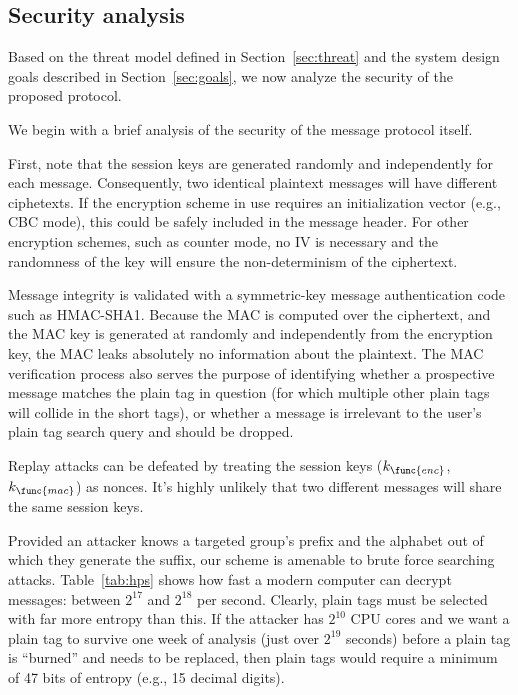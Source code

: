 \subsection{Security analysis}
\label{sec:security}

Based on the threat model defined in Section~\ref{sec:threat} and the
system design goals described in Section~\ref{sec:goals}, we now analyze
the security of the proposed \hoot protocol.

%
We begin with a brief analysis of the security of the message protocol
itself.

First, note that the session keys are generated randomly and
independently for each message. Consequently, two identical plaintext messages
will have different ciphetexts. If the encryption scheme in use requires
an initialization vector (e.g., CBC mode), this could be safely included in the
message header. For other encryption schemes, such as counter mode, no
IV is necessary and the randomness of the key will ensure the
non-determinism of the ciphertext.

Message integrity is validated with a symmetric-key message
authentication code such as HMAC-SHA1. Because the MAC is computed over the
ciphertext, and the MAC key is generated at randomly and independently
from the encryption key, the MAC leaks
absolutely no information about the plaintext. The MAC verification
process also serves the purpose of identifying whether a prospective
message matches the plain tag in question (for which multiple other
plain tags will collide in the short tags), or whether a message is
irrelevant to the user's plain tag search query and should be dropped.

Replay attacks can be defeated by treating the session keys
($k_{\func{enc}}$, $k_{\func{mac}}$) as nonces. It's highly unlikely
that two different messages will share the same session keys.


%
Provided an attacker knows a targeted group's prefix and the alphabet
out of which they generate the suffix, our scheme is amenable to brute
force searching attacks. Table~\ref{tab:hps} shows how fast a modern
computer can decrypt \hoot messages: between $2^{17}$ and $2^{18}$ per
second. Clearly, plain tags must be selected with far more entropy than
this. If the attacker has $2^{10}$ CPU cores and we want a plain tag to
survive one week of analysis (just over $2^{19}$ seconds) before a plain
tag is ``burned'' and needs to be replaced, then plain tags would
require a minimum of 47 bits of entropy (e.g., 15 decimal digits).

